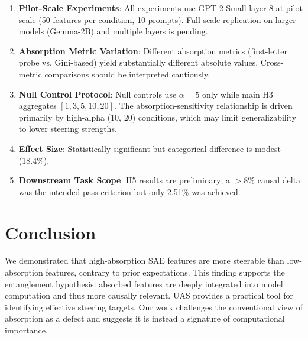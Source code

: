 \documentclass{article}
\begin{document}
\begin{enumerate}
    \item \textbf{Pilot-Scale Experiments}: All experiments use GPT-2 Small layer 8 at pilot scale (50 features per condition, 10 prompts). Full-scale replication on larger models (Gemma-2B) and multiple layers is pending.
    \item \textbf{Absorption Metric Variation}: Different absorption metrics (first-letter probe vs. Gini-based) yield substantially different absolute values. Cross-metric comparisons should be interpreted cautiously.
    \item \textbf{Null Control Protocol}: Null controls use $\alpha=5$ only while main H3 aggregates $[1, 3, 5, 10, 20]$. The absorption-sensitivity relationship is driven primarily by high-alpha (10, 20) conditions, which may limit generalizability to lower steering strengths.
    \item \textbf{Effect Size}: Statistically significant but categorical difference is modest (18.4\%).
    \item \textbf{Downstream Task Scope}: H5 results are preliminary; a $>8\%$ causal delta was the intended pass criterion but only 2.51\% was achieved.
\end{enumerate}


\section{Conclusion}

We demonstrated that high-absorption SAE features are more steerable than low-absorption features, contrary to prior expectations. This finding supports the entanglement hypothesis: absorbed features are deeply integrated into model computation and thus more causally relevant. UAS provides a practical tool for identifying effective steering targets. Our work challenges the conventional view of absorption as a defect and suggests it is instead a signature of computational importance.




\end{document}
